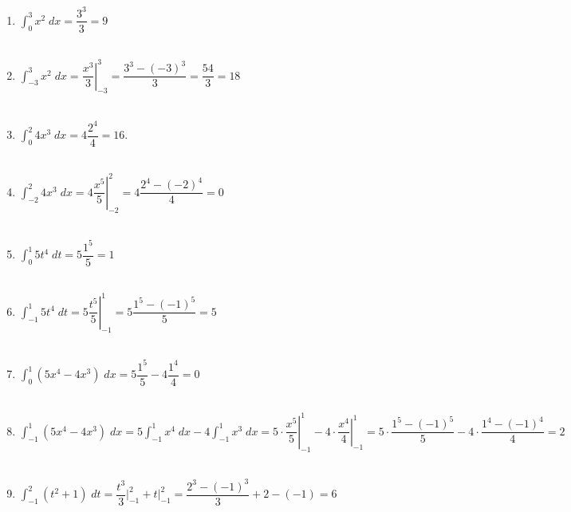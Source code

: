 \begin{enumerate}[\bfseries 1.]

    \item $\displaystyle\int_0^3 x^2 \;dx = \dfrac{3^{3}}{3} = 9$\\\\

    \item $\displaystyle\int_{-3}^3 x^2 \; dx = \left.\dfrac{x^3}{3}\right|_{-3}^3 = \dfrac{3^3 - (-3)^3}{3} = \dfrac{54}{3} = 18 $\\\\

    \item $\displaystyle\int_0^2 4x^3 \;dx = 4\dfrac{2^4}{4} = 16$.\\\\

    \item $\displaystyle\int_{-2}^2 4x^3 \; dx = 4 \left.\dfrac{x^5}{5}\right|_{-2}^{2} = 4 \dfrac{2^4 - (-2)^4}{4} = 0$\\\\ 

    \item $\displaystyle\int_0^1 5t^4 \; dt = 5\dfrac{1^5}{5} = 1$\\\\

    \item $\displaystyle\int_{-1}^1 5t^4 \; dt = 5\left.\dfrac{t^5}{5}\right|_{-1}^1 = 5\dfrac{1^5 - (-1)^5}{5} = 5$\\\\

    \item $\displaystyle\int_0^1 (5x^4 - 4x^3) \; dx = 5\dfrac{1^5}{5} - 4\dfrac{1^4}{4} = 0$\\\\

    \item $\displaystyle\int_{-1}^1 (5x^4 - 4x^3) \; dx = 5\int_{-1}^1 x^4 \; dx - 4\int_{-1}^1 x^3 \; dx = 5\cdot \left.\dfrac{x^5}{5}\right|_{-1}^1 - 4\cdot \left.\dfrac{x^4}{4}\right|_{-1}^1 = 5\cdot \dfrac{1^5 - (-1)^5}{5} - 4\cdot \dfrac{1^4 - (-1)^4}{4} = 2$\\\\

    \item $\displaystyle\int_{-1}^2 (t^2 + 1)\; dt = \dfrac{t^3}{3}\bigg|_{-1}^{2} + t\bigg|_{-1}^2 = \dfrac{2^3 - (-1)^3}{3} + 2 - (-1) = 6$\\\\


\end{enumerate}
